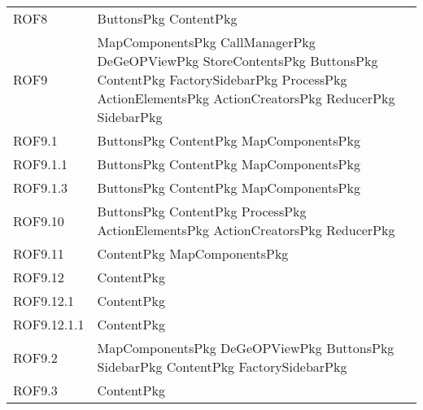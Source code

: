 \begin{longtable}{p{2.5cm}!{\VRule[1pt]}p{5cm}}
		ROF8 & ButtonsPkg \newline ContentPkg\\
		ROF9 & MapComponentsPkg \newline CallManagerPkg \newline DeGeOPViewPkg \newline StoreContentsPkg \newline ButtonsPkg \newline ContentPkg \newline FactorySidebarPkg \newline ProcessPkg \newline ActionElementsPkg \newline ActionCreatorsPkg \newline ReducerPkg \newline SidebarPkg\\
		ROF9.1 & ButtonsPkg \newline ContentPkg \newline MapComponentsPkg\\
		ROF9.1.1 & ButtonsPkg \newline ContentPkg \newline MapComponentsPkg\\
		ROF9.1.3 & ButtonsPkg \newline ContentPkg \newline MapComponentsPkg\\
		ROF9.10 & ButtonsPkg \newline ContentPkg \newline ProcessPkg \newline ActionElementsPkg \newline ActionCreatorsPkg \newline ReducerPkg\\
		ROF9.11 & ContentPkg \newline MapComponentsPkg\\
		ROF9.12 & ContentPkg\\
		ROF9.12.1 & ContentPkg\\
		ROF9.12.1.1 & ContentPkg\\
		ROF9.2 & MapComponentsPkg \newline DeGeOPViewPkg \newline ButtonsPkg \newline SidebarPkg \newline ContentPkg \newline FactorySidebarPkg\\
		ROF9.3 & ContentPkg\\

\end{longtable}
